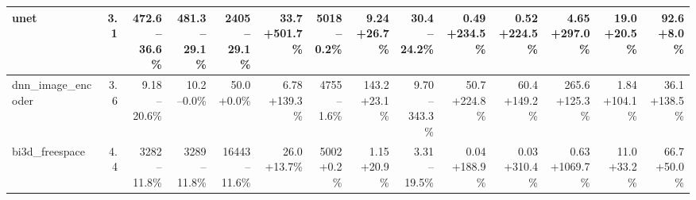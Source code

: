 \begin{table}[t]
{\begin{tabular}{lrrrrrrrrrrrrr}
\midrule
unet & 3.1 & \makecell[r]{472.6\\--36.6\%} & \makecell[r]{481.3\\--29.1\%} & \makecell[r]{2405\\--29.1\%} & \makecell[r]{33.7\\+501.7\%} & \makecell[r]{5018\\--0.2\%} & \makecell[r]{9.24\\+26.7\%} & \makecell[r]{30.4\\--24.2\%} & \makecell[r]{0.49\\+234.5\%} & \makecell[r]{0.52\\+224.5\%} & \makecell[r]{4.65\\+297.0\%} & \makecell[r]{19.0\\+20.5\%} & \makecell[r]{92.6\\+8.0\%} \\
\midrule
dnn\_image\_encoder & 3.6 & \makecell[r]{9.18\\--20.6\%} & \makecell[r]{10.2\\--0.0\%} & \makecell[r]{50.0\\+0.0\%} & \makecell[r]{6.78\\+139.3\%} & \makecell[r]{4755\\--1.6\%} & \makecell[r]{143.2\\+23.1\%} & \makecell[r]{9.70\\--343.3\%} & \makecell[r]{50.7\\+224.8\%} & \makecell[r]{60.4\\+149.2\%} & \makecell[r]{265.6\\+125.3\%} & \makecell[r]{1.84\\+104.1\%} & \makecell[r]{36.1\\+138.5\%} \\
\midrule
bi3d\_freespace & 4.4 & \makecell[r]{3282\\--11.8\%} & \makecell[r]{3289\\--11.8\%} & \makecell[r]{16443\\--11.6\%} & \makecell[r]{26.0\\+13.7\%} & \makecell[r]{5002\\+0.2\%} & \makecell[r]{1.15\\+20.9\%} & \makecell[r]{3.31\\--19.5\%} & \makecell[r]{0.04\\+188.9\%} & \makecell[r]{0.03\\+310.4\%} & \makecell[r]{0.63\\+1069.7\%} & \makecell[r]{11.0\\+33.2\%} & \makecell[r]{66.7\\+50.0\%} \\

\end{tabular}}
\end{table}
